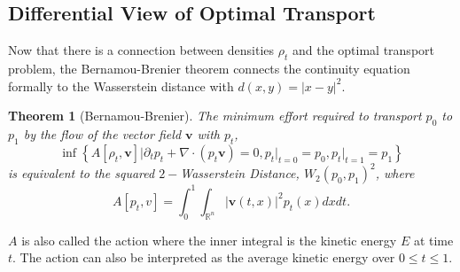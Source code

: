 \documentclass[12pt]{article}
\theoremstyle{plain}
\newtheorem{thm}{Theorem}[section]
\numberwithin{equation}{section}
\begin{document}
\subsection{Differential View of Optimal Transport}
Now that there is a connection between densities $\rho_t$ and the optimal transport problem, the Bernamou-Brenier theorem connects the continuity equation formally to the Wasserstein distance with $d(x,y) = |x-y|^2$.
\begin{thm}[Bernamou-Brenier]\label{thm:bernamou}
	The minimum effort required to transport $p_0$ to $p_1$ by the flow of the vector field $\mathbf{v}$ with $p_t$,
	\begin{equation}
		\inf\left\{A[\rho_t,\mathbf{v}]\bigg\vert\partial_t p_t + \nabla \cdot (p_t \mathbf{v}) = 0,p_t\vert_{t=0}=p_0, p_t\vert_{t=1}=p_1\right\}
	\end{equation} 
	is equivalent to the squared $2-$Wasserstein Distance, $W_2(p_0,p_1)^2$, where \[A[p_t,v] = \int_0^1\int_{\mathbb{R}^n} |\mathbf{v}(t,x)|^2p_t(x)dxdt.\]
\end{thm}
$A$ is also called the action where the inner integral is the kinetic energy $E$ at time $t$. The action can also be interpreted as the average kinetic energy over $0\le t \le 1$. 
\end{document}

